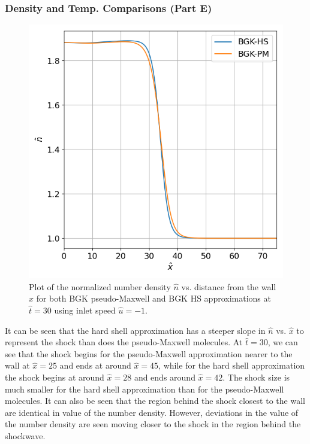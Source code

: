 \documentclass[a4paper]{article}
\begin{document}
\subsubsection{Density and Temp. Comparisons (Part E)}
\begin{figure}[hbt!]
    \centering
    \includegraphics[width=14cm]{plots/problem_e_n.png}
    \caption{\centering Plot of the normalized number density $\hat{n}$ vs. distance from the wall $\hat{x}$ for both BGK pseudo-Maxwell and BGK HS approximations at $\hat{t} = 30$ using inlet speed $\hat{u} = -1$.}
    \label{problem_e_n}
\end{figure}
It can be seen that the hard shell approximation has a steeper slope in $\hat{n}$ vs. $\hat{x}$ to represent the shock than does the pseudo-Maxwell molecules. At $\hat{t} = 30$, we can see that the shock begins for the pseudo-Maxwell approximation nearer to the wall at $\hat{x} = 25$ and ends at around $\hat{x} = 45$, while for the hard shell approximation the shock begins at around $\hat{x} = 28$ and ends around $\hat{x} = 42$. The shock size is much smaller for the hard shell approximation than for the pseudo-Maxwell molecules. It can also be seen that the region behind the shock closest to the wall are identical in value of the number density. However, deviations in the value of the number density are seen moving closer to the shock in the region behind the shockwave. 
\end{document}
